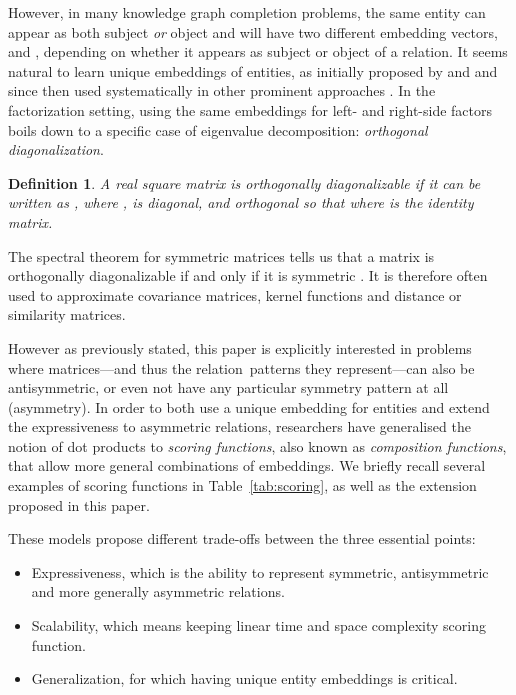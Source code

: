 \documentclass[twoside,11pt]{article}
\renewcommand{\cite}{\citep}
\newtheorem{defn}{Definition}
\begin{document}
However, in many knowledge graph completion problems, the same entity  can appear as both subject
\emph{or} object and will have two different embedding vectors,  and , depending on whether it appears as subject or object of a relation. 
It seems natural to learn unique embeddings of entities, as 
initially proposed by \citet{Nickel2011} and \citet{bordes2011learning} 
and since then used systematically in other prominent approaches \cite{bordes2013translating,Yang2015,socher2013reasoning}. 
In the factorization setting, using the same embeddings for left- and right-side factors boils down to a specific case of eigenvalue decomposition: \emph{orthogonal diagonalization}.




\newcommand{\normalSpace}{\mathcal{H}}

\begin{defn}
A real square matrix  is orthogonally diagonalizable if it can be
written as , where ,  is diagonal, and  orthogonal so that  where  is the identity matrix.
\end{defn}

The spectral theorem for symmetric matrices tells us that a matrix 
is orthogonally diagonalizable if and only if it is symmetric \cite{cauchy1829}.
It is therefore often used to approximate covariance matrices, kernel functions and distance or similarity matrices. 


However as previously stated, this paper is explicitly interested
in problems where matrices---and thus the \mbox{relation patterns} they represent---can 
also be antisymmetric, or even not have any particular symmetry pattern at all (asymmetry). In order to both use a unique embedding for entities and extend the expressiveness to asymmetric relations, researchers have generalised the notion of dot products to \emph{scoring functions}, also known as \emph{composition functions}, that allow more general combinations of embeddings. We briefly recall several examples of scoring functions in Table~\ref{tab:scoring}, as well
as the extension proposed in this paper. 




These models propose different trade-offs between the three essential points:

\begin{itemize}
    \item Expressiveness, which is the ability to represent symmetric, antisymmetric and more generally asymmetric relations.
    \item Scalability, which means keeping linear time and space complexity scoring function.
    \item Generalization, for which having unique entity embeddings is critical.
\end{itemize}
\end{document}
